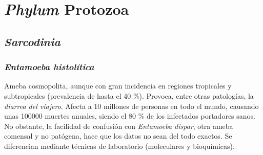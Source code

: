 \chapter{\textit{Phylum} Protozoa}
\section{\textit{Sarcodinia}}
\subsection{\textit{Entamoeba histolítica}}
Ameba cosmopolita, aunque con gran incidencia en regiones tropicales y subtropicales (prevalencia de hasta el 40 \%). Provoca, entre otras patologías, la \textit{diarrea del viajero}. Afecta a 10 millones de personas en todo el mundo, causando unas 100000 muertes anuales, siendo el 80 \% de los infectados portadores sanos. No obstante, la facilidad de confusión con \textit{Entamoeba dispar}, otra ameba comensal y no patógena, hace que los datos no sean del todo exactos. Se diferencian mediante técnicas de laboratorio (moleculares y bioquímicas).

